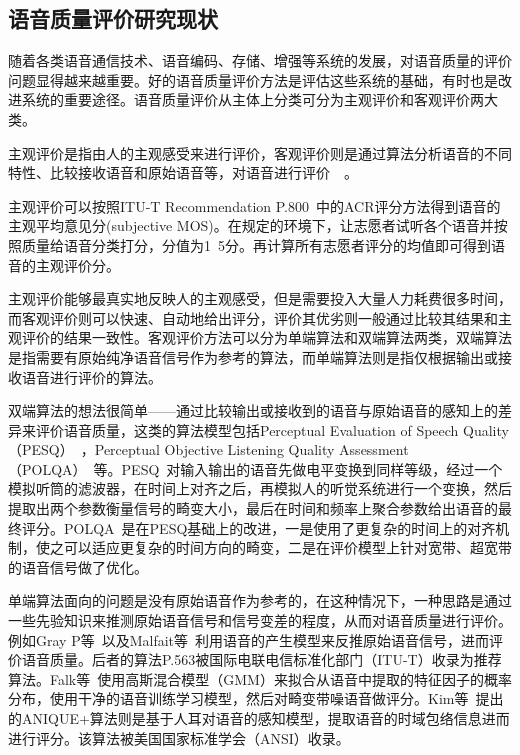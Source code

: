 \subsection{语音质量评价研究现状}

随着各类语音通信技术、语音编码、存储、增强等系统的发展，对语音质量的评价问题显得越来越重要。好的语音质量评价方法是评估这些系统的基础，有时也是改进系统的重要途径。语音质量评价从主体上分类可分为主观评价和客观评价两大类。

主观评价是指由人的主观感受来进行评价，客观评价则是通过算法分析语音的不同特性、比较接收语音和原始语音等，对语音进行评价~\cite{肖累累2013语音质量客观评价方法的研究}~\cite{moller2011speech}。

主观评价可以按照ITU-T Recommendation P.800~\cite{rec1996p}中的ACR评分方法得到语音的主观平均意见分(subjective MOS)。在规定的环境下，让志愿者试听各个语音并按照质量给语音分类打分，分值为1~5分。再计算所有志愿者评分的均值即可得到语音的主观评价分。

主观评价能够最真实地反映人的主观感受，但是需要投入大量人力耗费很多时间，而客观评价则可以快速、自动地给出评分，评价其优劣则一般通过比较其结果和主观评价的结果一致性。客观评价方法可以分为单端算法和双端算法两类，双端算法是指需要有原始纯净语音信号作为参考的算法，而单端算法则是指仅根据输出或接收语音进行评价的算法。

双端算法的想法很简单——通过比较输出或接收到的语音与原始语音的感知上的差异来评价语音质量，这类的算法模型包括Perceptual Evaluation of Speech Quality（PESQ）~\cite{recommendation2001perceptual}，Perceptual Objective Listening Quality Assessment（POLQA）~\cite{rec2011p}等。PESQ~\cite{recommendation2001perceptual}对输入输出的语音先做电平变换到同样等级，经过一个模拟听筒的滤波器，在时间上对齐之后，再模拟人的听觉系统进行一个变换，然后提取出两个参数衡量信号的畸变大小，最后在时间和频率上聚合参数给出语音的最终评分。POLQA~\cite{rec2011p}是在PESQ基础上的改进，一是使用了更复杂的时间上的对齐机制，使之可以适应更复杂的时间方向的畸变，二是在评价模型上针对宽带、超宽带的语音信号做了优化。

单端算法面向的问题是没有原始语音作为参考的，在这种情况下，一种思路是通过一些先验知识来推测原始语音信号和信号变差的程度，从而对语音质量进行评价。例如Gray P等~\cite{gray2000non}以及Malfait等~\cite{malfait2006p}利用语音的产生模型来反推原始语音信号，进而评价语音质量。后者的算法P.563被国际电联电信标准化部门（ITU-T）收录为推荐算法。Falk等~\cite{falk2006nonintrusive}使用高斯混合模型（GMM）来拟合从语音中提取的特征因子的概率分布，使用干净的语音训练学习模型，然后对畸变带噪语音做评分。Kim等~\cite{ANIQUE+}提出的ANIQUE+算法则是基于人耳对语音的感知模型，提取语音的时域包络信息进而进行评分。该算法被美国国家标准学会（ANSI）收录。


